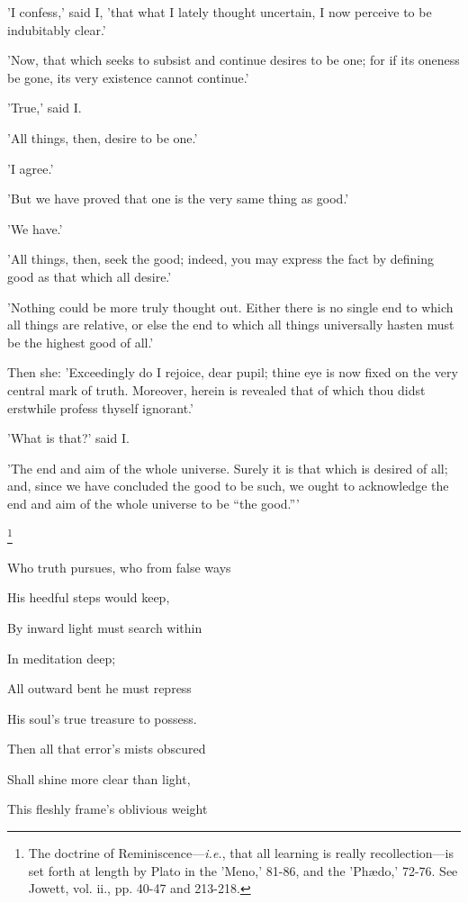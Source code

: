 'I confess,' said I, 'that what I lately thought uncertain, I now
perceive to be indubitably clear.'

'Now, that which seeks to subsist and continue desires to be one; for if
its oneness be gone, its very existence cannot continue.'

'True,' said I.

'All things, then, desire to be one.'

'I agree.'

'But we have proved that one is the very same thing as good.'

'We have.'

'All things, then, seek the good; indeed, you may express the fact by
defining good as that which all desire.'

'Nothing could be more truly thought out. Either there is no single end
to which all things are relative, or else the end to which all things
universally hasten must be the highest good of all.'

Then she: 'Exceedingly do I rejoice, dear pupil; thine eye is now fixed
on the very central mark of truth. Moreover, herein is revealed that of
which thou didst erstwhile profess thyself ignorant.'

'What is that?' said I.

'The end and aim of the whole universe. Surely it is that which is
desired of all; and, since we have concluded the good to be such, we
ought to acknowledge the end and aim of the whole universe to be ``the
good.'''


\footnote{The doctrine of Reminiscence—\emph{i.e.}, that all learning is
really recollection—is set forth at length by Plato in the 'Meno,'
81-86, and the 'Phædo,' 72-76. See Jowett, vol. ii., pp. 40-47 and
213-218.}

Who truth pursues, who from false ways

His heedful steps would keep,

By inward light must search within

In meditation deep;

All outward bent he must repress

His soul's true treasure to possess.

Then all that error's mists obscured

Shall shine more clear than light,

This fleshly frame's oblivious weight

